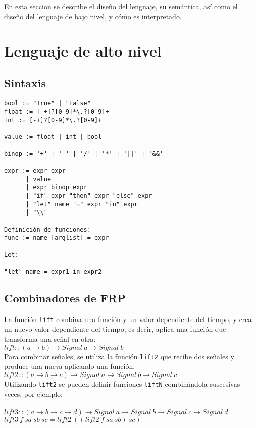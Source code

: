 En esta seccion se describe el diseño del lenguaje, su semántica,
así como el diseño del lenguaje de bajo nivel, y cómo es interpretado.

\section{Lenguaje de alto nivel}

\subsection{Sintaxis}

\begin{verbatim}
bool := "True" | "False"
float := [-+]?[0-9]*\.?[0-9]+
int := [-+]?[0-9]*\.?[0-9]+

value := float | int | bool

binop := '+' | '-' | '/' | '*' | '||' | '&&'

expr := expr expr 
      | value
      | expr binop expr
      | "if" expr "then" expr "else" expr
      | "let" name "=" expr "in" expr
      | "\\"

Definición de funciones:
func := name [arglist] = expr

Let:

"let" name = expr1 in expr2

\end{verbatim}


\subsection{Combinadores de FRP}

La función \texttt{lift} combina una función y un valor
dependiente del tiempo, y crea un nuevo valor dependiente
del tiempo, es decir, aplica una función que transforma
una señal en otra:\\


$lift :: (a \rightarrow b) \rightarrow Signal\ a \rightarrow Signal\ b$\\


Para combinar señales, se utiliza la función \texttt{lift2}
que recibe dos señales y produce una nueva aplicando una
función.\\

$lift2 :: (a \rightarrow b \rightarrow c) \rightarrow Signal\ a \rightarrow Signal\ b \rightarrow Signal\ c$\\

Utilizando \texttt{lift2} se pueden definir funciones \texttt{liftN}
combinándola suscesivas veces, por ejemplo:\\
\\
$lift3 :: (a \rightarrow b \rightarrow c \rightarrow d) \rightarrow Signal\ a \rightarrow Signal\ b \rightarrow Signal\ c \rightarrow Signal\ d$\\
$lift3\ f\ sa\ sb\ sc = lift2\ ((lift2\ f\ sa\ sb)\ sc)$\\


